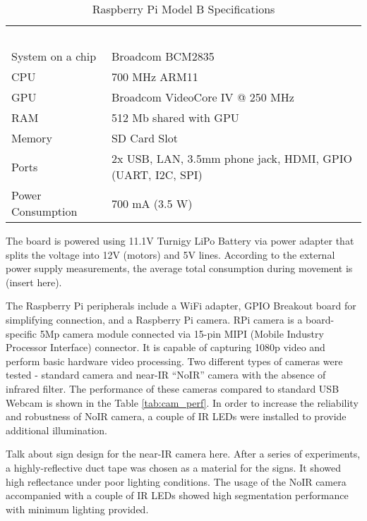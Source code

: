 \begin{table}[h!]
	\setlength\extrarowheight{2pt}
    \begin{tabularx}{\textwidth}{XX}
    
    ~                 & ~                                                           \\
    System on a chip  & Broadcom BCM2835                                            \\
    CPU               & 700 MHz ARM11                                               \\
    GPU               & Broadcom VideoCore IV @ 250 MHz                             \\
    RAM               & 512 Mb shared with GPU                                      \\
    Memory            & SD Card Slot                                                \\
    Ports             & 2x USB, LAN, 3.5mm phone jack, HDMI,  GPIO (UART, I2C, SPI) \\
    Power Consumption & 700 mA (3.5 W)                                              \\
    
    \end{tabularx}
    \caption{Raspberry Pi Model B Specifications}
    \label{tab:rpi_specs}
\end{table}


The board is powered using 11.1V Turnigy LiPo Battery via power adapter that
splits the voltage into 12V (motors) and 5V lines. According to the external
power supply measurements, the average total consumption during movement is
(insert here).

The Raspberry Pi peripherals include a WiFi adapter, GPIO Breakout board for
simplifying connection, and a Raspberry Pi camera. RPi camera is a
board-specific 5Mp camera module connected via 15-pin MIPI (Mobile Industry
Processor Interface) connector. It is capable of capturing 1080p video and
perform basic hardware video processing. Two different types of cameras were
tested - standard camera and near-IR ``NoIR'' camera with the absence of
infrared filter. The performance of these cameras compared to standard USB
Webcam is shown in the Table \ref{tab:cam_perf}. In order to
increase the reliability and robustness of NoIR camera, a couple of IR LEDs were
installed to provide additional illumination.

Talk about sign design for the near-IR camera here.
After a series of experiments, a highly-reflective duct tape was chosen as a
material for the signs. It showed high reflectance under poor lighting
conditions. The usage of the NoIR camera accompanied with a couple of IR LEDs
showed high segmentation performance with minimum lighting provided.

